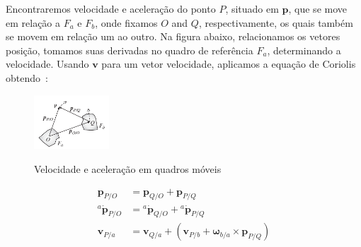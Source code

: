 Encontraremos velocidade e aceleração do ponto \(P\), situado em \(\mathbf{p}\), que se move em relação a \(F_{a}\) e \(F_{b}\), onde fixamos \(O\) and \(Q\), respectivamente, os quais também se movem em relação um ao outro. Na figura abaixo, relacionamos os vetores posição, tomamos suas derivadas no quadro de referência\footnotemark{} \(F_{a}\),  determinando a velocidade. Usando \(\mathbf{v}\) para um vetor velocidade, aplicamos a equação de Coriolis obtendo~\cite{Stevens2016}:
\begin{figure}[H]
    \centering
    \includegraphics[width=0.25\textwidth, keepaspectratio]{figuras/figure1.5-1.png}
    \label{fig1.5-1}
    \caption{Velocidade e aceleração em quadros móveis}
\end{figure}
\begin{align}
    \mathbf{p}_{P/O}             &= \mathbf{p}_{Q/O} + \mathbf{p}_{P/Q} \tag{1.5-1} \\
    {^{a}\dot{\mathbf{p}}_{P/O}} &= {^{a}\dot{\mathbf{p}}_{Q/O}} + {^{a}\dot{\mathbf{p}}_{P/Q}} \tag{1.5-2} \\
    \mathbf{v}_{P/a}             &= \mathbf{v}_{Q/a} + \left( \mathbf{v}_{P/b} + \mathbf{\omega}_{b/a}\!\times\!\mathbf{p}_{P/Q} \right) \tag{1.5-3}
\end{align}

